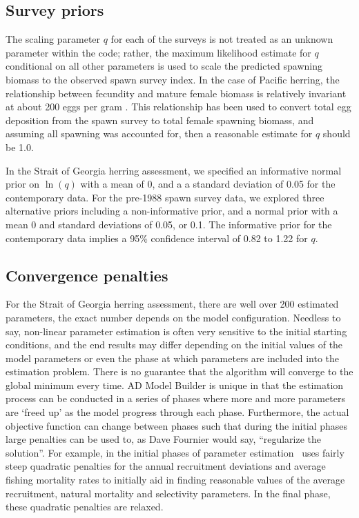 \subsection{Survey priors}

The scaling parameter $q$ for each of the surveys is not treated as an unknown parameter within the code; rather, the maximum likelihood estimate for $q$ conditional on all other parameters is used to scale the predicted spawning biomass to the observed spawn survey index.  In the case of Pacific herring, the relationship between fecundity and mature female biomass is relatively invariant at about 200 eggs per gram \citep{hay1985reproductive,hardwick1973biomass}.  This relationship has been used to convert total egg deposition from the spawn survey to total female spawning biomass, and assuming all spawning was accounted for, then a reasonable estimate for $q$ should be 1.0.

In the Strait of Georgia herring assessment, we specified an informative normal prior on $\ln(q)$ with a mean of 0, and a a standard deviation of 0.05 for the contemporary data.  For the pre-1988 spawn survey data, we explored three alternative priors including a non-informative prior, and a normal prior with a mean 0 and standard deviations of 0.05, or 0.1.  The informative prior for the contemporary data implies a 95\% confidence interval of 0.82 to 1.22 for $q$.

\subsection{Convergence penalties}

For the Strait of Georgia herring assessment, there are well over 200 estimated parameters, the exact number depends on the model configuration.  Needless to say, non-linear parameter estimation is often very sensitive to the initial starting conditions, and the end results may differ depending on the initial values of the model parameters or even the phase at which parameters are included into the estimation problem.  There is no guarantee that the algorithm will converge to the global minimum every time.  AD Model Builder is unique in that the estimation process can be conducted in a series of phases where more and more parameters are `freed up' as the model progress through each phase.  Furthermore, the actual objective function can change between phases such that during the initial phases large penalties can be used to, as Dave Fournier would say, ``regularize the solution''.  For example, in the initial phases of parameter estimation \iscam\ uses fairly steep quadratic penalties for the annual recruitment deviations and average fishing mortality rates to initially aid in finding reasonable values of the average recruitment, natural mortality and selectivity parameters.  In the final phase, these quadratic penalties are relaxed.

